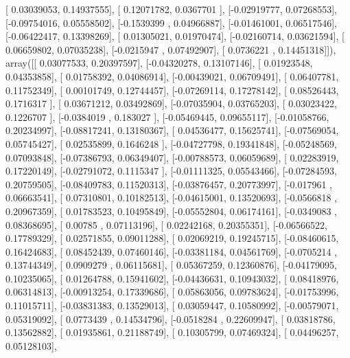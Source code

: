 \documentclass{article}
\begin{document}
       [ 0.03039053,  0.14937555],
       [ 0.12071782,  0.0367701 ],
       [-0.02919777,  0.07268553],
       [-0.09754016,  0.05558502],
       [-0.1539399 ,  0.04966887],
       [-0.01461001,  0.06517546],
       [-0.06422417,  0.13398269],
       [ 0.01305021,  0.01970474],
       [-0.02160714,  0.03621594],
       [ 0.06659802,  0.07035238],
       [-0.0215947 ,  0.07492907],
       [ 0.0736221 ,  0.14451318]]), array([[ 0.03077533,  0.20397597],
       [-0.04320278,  0.13107146],
       [ 0.01923548,  0.04353858],
       [ 0.01758392,  0.04086914],
       [-0.00439021,  0.06709491],
       [ 0.06407781,  0.11752349],
       [ 0.00101749,  0.12744457],
       [-0.07269114,  0.17278142],
       [ 0.08526443,  0.1716317 ],
       [ 0.03671212,  0.03492869],
       [-0.07035904,  0.03765203],
       [ 0.03023422,  0.1226707 ],
       [-0.0384019 ,  0.183027  ],
       [-0.05469445,  0.09655117],
       [-0.01058766,  0.20234997],
       [-0.08817241,  0.13180367],
       [ 0.04536477,  0.15625741],
       [-0.07569054,  0.05745427],
       [ 0.02535899,  0.1646248 ],
       [-0.04727798,  0.19341848],
       [-0.05248569,  0.07093848],
       [-0.07386793,  0.06349407],
       [-0.00788573,  0.06059689],
       [ 0.02283919,  0.17220149],
       [-0.02791072,  0.1115347 ],
       [-0.01111325,  0.05543466],
       [-0.07284593,  0.20759505],
       [-0.08409783,  0.11520313],
       [-0.03876457,  0.20773997],
       [-0.017961  ,  0.06663541],
       [ 0.07310801,  0.10182513],
       [-0.04615001,  0.13520693],
       [-0.0566818 ,  0.20967359],
       [ 0.01783523,  0.10495849],
       [-0.05552804,  0.06174161],
       [-0.0349083 ,  0.08368695],
       [ 0.00785   ,  0.07113196],
       [ 0.02242168,  0.20355351],
       [-0.06566522,  0.17789329],
       [ 0.02571855,  0.09011288],
       [ 0.02069219,  0.19245715],
       [-0.08460615,  0.16424683],
       [ 0.08452439,  0.07460146],
       [-0.03381184,  0.04561769],
       [-0.0705214 ,  0.13744349],
       [ 0.0909279 ,  0.06115681],
       [ 0.05367259,  0.12360876],
       [-0.04179095,  0.10235065],
       [ 0.01264788,  0.15941602],
       [-0.04436631,  0.10943032],
       [ 0.08418976,  0.06314813],
       [-0.00913254,  0.17339686],
       [ 0.05863056,  0.09783624],
       [-0.01753996,  0.11015711],
       [-0.03831383,  0.13529013],
       [ 0.03059447,  0.10580992],
       [-0.00579071,  0.05319092],
       [ 0.0773439 ,  0.14534796],
       [-0.0518284 ,  0.22609947],
       [ 0.03818786,  0.13562882],
       [ 0.01935861,  0.21188749],
       [ 0.10305799,  0.07469324],
       [ 0.04496257,  0.05128103],
\end{document}
